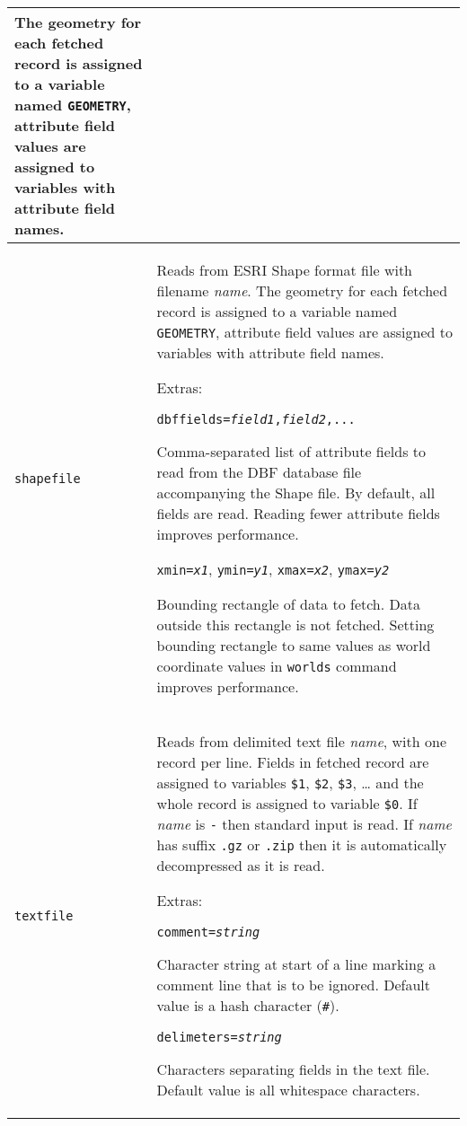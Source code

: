 \begin{longtable}{|p{3cm}|p{10cm}|}
The geometry for each fetched record is assigned to a variable named
\texttt{GEOMETRY}, attribute field values are assigned to
variables with attribute field names. \\

\hline

\texttt{shapefile} &
Reads from ESRI Shape format file with filename \textit{name}.
The geometry for each fetched record is assigned to a variable named
\texttt{GEOMETRY}, attribute field values are assigned to
variables with attribute field names.

\vspace{10pt}
Extras:

\texttt{dbffields=\textit{field1},\textit{field2},...}

Comma-separated list of
attribute fields to read from the DBF database file accompanying the
Shape file.  By default, all fields are read.  Reading fewer attribute
fields improves performance.

\vspace{10pt}
\texttt{xmin=\textit{x1}},
\texttt{ymin=\textit{y1}},
\texttt{xmax=\textit{x2}},
\texttt{ymax=\textit{y2}}

Bounding rectangle of data to fetch.  Data outside this rectangle is
not fetched.  Setting bounding rectangle to same values as world
coordinate values in \texttt{worlds} command improves performance. \\

\hline

\texttt{textfile} &
Reads from delimited text file \textit{name}, with one
record per line.  Fields in fetched record
are assigned to variables
\texttt{\$1}, \texttt{\$2}, \texttt{\$3}, \dots
and the whole record is assigned to variable
\texttt{\$0}.
If \textit{name} is \texttt{-} then standard input is read.
If \textit{name} has suffix \texttt{.gz} or \texttt{.zip}
then it is automatically decompressed as it is read.

\vspace{10pt}
Extras:

\texttt{comment=\textit{string}}

Character string at start of a line marking a comment line that
is to be ignored.  Default value is a hash character (\texttt{\#}).

\vspace{10pt}
\texttt{delimeters=\textit{string}}

Characters separating fields in the text file.  Default value
is all whitespace characters. \\

\end{longtable}

